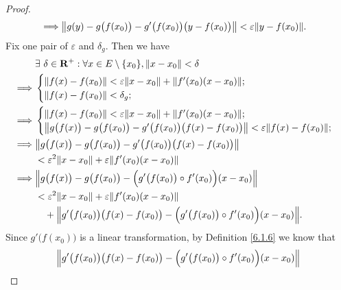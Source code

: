 \begin{proof}
\begin{align*}
        \implies & \norm*{g(y) - g\big(f(x_0)\big) - g'\big(f(x_0)\big)\big(y - f(x_0)\big)} < \varepsilon \norm*{y - f(x_0)}.
    \end{align*}
    Fix one pair of \(\varepsilon\) and \(\delta_g\).
    Then we have
    \begin{align*}
                 & \exists\ \delta \in \mathbf{R}^+ : \forall x \in E \setminus \{x_0\}, \norm*{x - x_0} < \delta                               \\
        \implies & \begin{cases}
                       \norm*{f(x) - f(x_0)} < \varepsilon \norm*{x - x_0} + \norm*{f'(x_0)(x - x_0)}; \\
                       \norm*{f(x) - f(x_0)} < \delta_g;
                   \end{cases}                                              \\
        \implies & \begin{cases}
                       \norm*{f(x) - f(x_0)} < \varepsilon \norm*{x - x_0} + \norm*{f'(x_0)(x - x_0)}; \\
                       \norm*{g\big(f(x)\big) - g\big(f(x_0)\big) - g'\big(f(x_0)\big) \big(f(x) - f(x_0)\big)} < \varepsilon \norm*{f(x) - f(x_0)};
                   \end{cases} \\
        \implies & \norm*{g\big(f(x)\big) - g\big(f(x_0)\big) - g'\big(f(x_0)\big) \big(f(x) - f(x_0)\big)}                                     \\
                 & < \varepsilon^2 \norm*{x - x_0} + \varepsilon \norm*{f'(x_0)(x - x_0)}                                                       \\
        \implies & \norm*{g\big(f(x)\big) - g\big(f(x_0)\big) - \Big(g'\big(f(x_0)\big) \circ f'(x_0)\Big) (x - x_0)}                           \\
                 & < \varepsilon^2 \norm*{x - x_0} + \varepsilon \norm*{f'(x_0)(x - x_0)}                                                       \\
                 & \quad + \norm*{g'\big(f(x_0)\big) \big(f(x) - f(x_0)\big) - \Big(g'\big(f(x_0)\big) \circ f'(x_0)\Big) (x - x_0)}.
    \end{align*}
    Since \(g'\big(f(x_0)\big)\) is a linear transformation, by Definition \ref{6.1.6} we know that
    \begin{align*}
         & \norm*{g'\big(f(x_0)\big) \big(f(x) - f(x_0)\big) - \Big(g'\big(f(x_0)\big) \circ f'(x_0)\Big) (x - x_0)} \\

\end{align*}
\end{proof}

